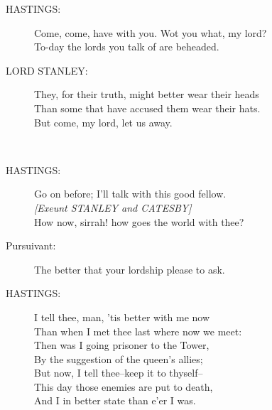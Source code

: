 \documentclass{article}
\begin{document}
\begin{description}
\item[HASTINGS:] 
\hspace{1pt}Come, come, have with you. Wot you what, my lord?\\
\hspace{1pt}To-day the lords you talk of are beheaded.\\
\end{description}
\begin{description}
\item[LORD STANLEY:] 
\hspace{1pt}They, for their truth, might better wear their heads\\
\hspace{1pt}Than some that have accused them wear their hats.\\
\hspace{1pt}But come, my lord, let us away.\\
\end{description}
\\
\begin{description}
\item[HASTINGS:] 
\hspace{1pt}Go on before; I'll talk with this good fellow.\\
{\it [Exeunt STANLEY and CATESBY]}\\
\hspace{1pt}How now, sirrah! how goes the world with thee?\\
\end{description}
\begin{description}
\item[Pursuivant:] 
\hspace{1pt}The better that your lordship please to ask.\\
\end{description}
\begin{description}
\item[HASTINGS:] 
\hspace{1pt}I tell thee, man, 'tis better with me now\\
\hspace{1pt}Than when I met thee last where now we meet:\\
\hspace{1pt}Then was I going prisoner to the Tower,\\
\hspace{1pt}By the suggestion of the queen's allies;\\
\hspace{1pt}But now, I tell thee--keep it to thyself--\\
\hspace{1pt}This day those enemies are put to death,\\
\hspace{1pt}And I in better state than e'er I was.\\
\end{description}
\end{document}
